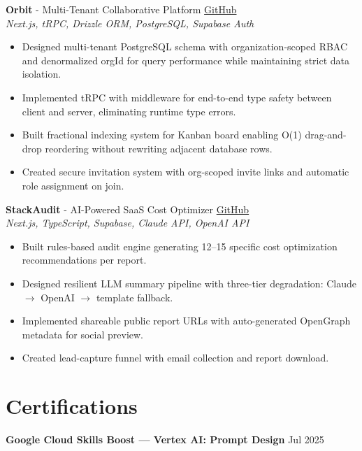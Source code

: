 \documentclass[11pt,letterpaper]{article}
\newcommand{\resumeItem}[1]{\item #1}
\newcommand{\projectHeader}[4]{
  \textbf{#1} - #2 \hfill #3\\
  \textit{#4}
}
\begin{document}
\projectHeader
  {Orbit}
  {Multi-Tenant Collaborative Platform}
  {\href{https://github.com/vbhvx/Orbit}{GitHub}}
  {Next.js, tRPC, Drizzle ORM, PostgreSQL, Supabase Auth}
\begin{itemize}
  \resumeItem{Designed multi-tenant PostgreSQL schema with organization-scoped RBAC and denormalized orgId for query performance while maintaining strict data isolation.}
  \resumeItem{Implemented tRPC with middleware for end-to-end type safety between client and server, eliminating runtime type errors.}
  \resumeItem{Built fractional indexing system for Kanban board enabling O(1) drag-and-drop reordering without rewriting adjacent database rows.}
  \resumeItem{Created secure invitation system with org-scoped invite links and automatic role assignment on join.}
\end{itemize}

\projectHeader
  {StackAudit}
  {AI-Powered SaaS Cost Optimizer}
  {\href{https://github.com/vbhvx/StackAudit}{GitHub}}
  {Next.js, TypeScript, Supabase, Claude API, OpenAI API}
\begin{itemize}
  \resumeItem{Built rules-based audit engine generating 12--15 specific cost optimization recommendations per report.}
  \resumeItem{Designed resilient LLM summary pipeline with three-tier degradation: Claude $\rightarrow$ OpenAI $\rightarrow$ template fallback.}
  \resumeItem{Implemented shareable public report URLs with auto-generated OpenGraph metadata for social preview.}
  \resumeItem{Created lead-capture funnel with email collection and report download.}
\end{itemize}

\section{Certifications}
\textbf{Google Cloud Skills Boost --- Vertex AI: Prompt Design} \hfill Jul 2025
\end{document}
